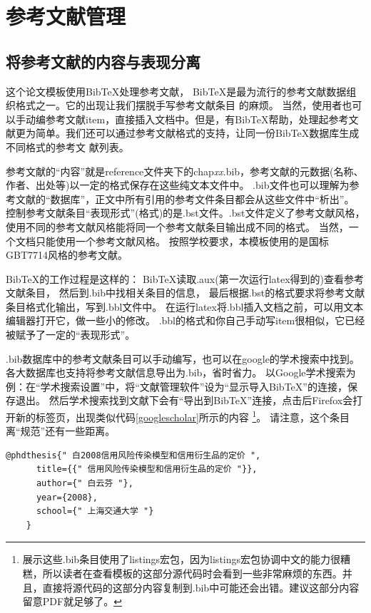 \section{参考文献管理}

\subsection{将参考文献的内容与表现分离}

这个论文模板使用BibTeX处理参考文献，
BibTeX是最为流行的参考文献数据组织格式之一。它的出现让我们摆脱手写参考文献条目
的麻烦。
当然，使用者也可以手动编参考文献item，直接插入文档中。但是，有BibTeX帮助，处理起参考文献更为简单。我们还可以通过参考文献格式的支持，让同一份BibTeX数据库生成不同格式的参考文
献列表。

参考文献的``内容''就是reference文件夹下的chap\textit{xx}.bib，参考文献的元数据(名称、作者、出处等)以一定的格式保存在这些纯文本文件中。
.bib文件也可以理解为参考文献的``数据库''，正文中所有引用的参考文件条目都会从这些文件中``析出''。
控制参考文献条目``表现形式''(格式)的是.bst文件。.bst文件定义了参考文献风格，使用不同的参考文献风格能将同一个参考文献条目输出成不同的格式。
当然，一个文档只能使用一个参考文献风格。
按照学校要求，本模板使用的是国标GBT7714风格的参考文献。

BibTeX的工作过程是这样的：
BibTeX读取.aux(第一次运行latex得到的)查看参考文献条目，
然后到.bib中找相关条目的信息，
最后根据.bst的格式要求将参考文献条目格式化输出，写到.bbl文件中。
在运行latex将.bbl插入文档之前，可以用文本编辑器打开它，做一些小的修改。
.bbl的格式和你自己手动写item很相似，它已经被赋予了一定的``表现形式''。

.bib数据库中的参考文献条目可以手动编写，也可以在google的学术搜索中找到。
各大数据库也支持将参考文献信息导出为.bib，省时省力。
以Google学术搜索为例：在``学术搜索设置''中，将``文献管理软件''设为``显示导入BibTeX''的连接，保存退出。
然后学术搜索找到文献下会有``导出到BibTeX''连接，点击后Firefox会打开新的标签页，出现类似代码\ref{googlescholar}所示的内容
\footnote{展示这些.bib条目使用了listings宏包，因为listings宏包协调中文的能力很糟糕，所以读者在查看模板的这部分源代码时会看到一些非常麻烦的东西。并且，直接将源代码的这部分内容复制到.bib中可能还会出错。建议这部分内容留意PDF就足够了。}。
请注意，这个条目离``规范''还有一些距离。

  \begin{lstlisting}[caption={从Google Scholar找到的，但并不规范的.bib条目}, label=googlescholar, float, escapeinside="", numbers=none]
    @phdthesis{" 白2008信用风险传染模型和信用衍生品的定价 ",
      title={{" 信用风险传染模型和信用衍生品的定价 "}},
      author={" 白云芬 "},
      year={2008},
      school={" 上海交通大学 "}
    } 
  \end{lstlisting}

